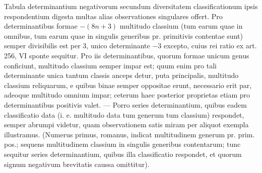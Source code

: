 Tabula determinantium negativorum secundum diversitatem classificationum ipsis respondentium digesta multas alias observationes singulares offert. Pro determinantibus formae \(-(8n+3)\) multitudo classium (tum earum quae in omnibus, tum earum quae in singulis generibus pr. primitivis contentae sunt) semper divisibilis est per \(3\), unico determinante \(-3\) excepto, cuius rei ratio ex art. 256, VI sponte sequitur. Pro iis determinantibus, quorum formae unicum genus conficiunt, multitudo classium semper impar est; quum enim pro tali determinante unica tantum classis anceps detur, puta principalis, multitudo classium reliquarum, e quibus binae semper oppositae erunt, necessario erit par, adeoque multitudo omnium impar; ceterum haec posterior proprietas etiam pro determinantibus positivis valet. — Porro series determinantium, quibus eadem classificatio data (i. e. multitudo data tum generum tum classium) respondet, semper abrumpi videtur, quam observationem satis miram per aliquot exempla illustramus. (Numerus primus, romanus, indicat multitudinem generum pr. prim. pos.; sequens multitudinem classium in singulis generibus contentarum; tunc sequitur series determinantium, quibus illa classificatio respondet, et quorum signum negativum brevitatis caussa omittitur).


